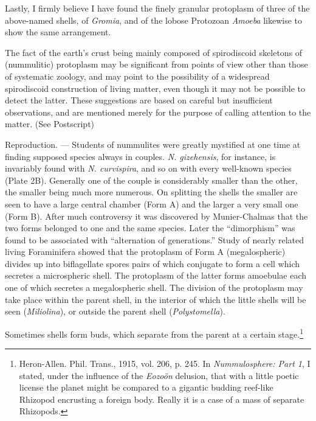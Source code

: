 \documentclass[a4paper, 12pt, oneside]{article}
\begin{document}
Lastly, I firmly believe I have found the finely granular protoplasm of three of the above-named shells, of \emph{Gromia}, and of the lobose Protozoan \emph{Amoeba} likewise to show the same arrangement.

The fact of the earth's crust being mainly composed of spirodiscoid skeletons of (nummulitic) protoplasm may be significant from points of view other than those of systematic zoology, and may point to the possibility of a widespread spirodiscoid construction of living matter, even though it may not be possible to detect the latter. These suggestions are based on careful but insufficient observations, and are mentioned merely for the purpose of calling attention to the matter. (See Postscript)

Reproduction. --- Students of nummulites were greatly mystified at one time at finding supposed species always in couples. \emph{N. gizehensis}, for instance, is invariably found with \emph{N. curvispira}, and so on with every well-known species (Plate 2B). Generally one of the couple is considerably smaller than the other, the smaller being much more numerous. On splitting the shells the smaller are seen to have a large central chamber (Form A) and the larger a very small one (Form B). After much controversy it was discovered by Munier-Chalmas that the two forms belonged to one and the same species. Later the ``dimorphism'' was found to be associated with ``alternation of generations.'' Study of nearly related living Foraminifera showed that the protoplasm of Form A (megalospheric) divides up into biflagellate spores pairs of which conjugate to form a cell which secretes a microspheric shell. The protoplasm of the latter forms amoebulae each one of which secretes a megalospheric shell. The division of the protoplasm may take place within the parent shell, in the interior of which the little shells will be seen (\emph{Miliolina}), or outside the parent shell (\emph{Polystomella}).

Sometimes shells form buds, which separate from the parent at a certain stage.\footnote{Heron-Allen. Phil. Trans., 1915, vol. 206, p. 245. In \emph{Nummulosphere: Part 1}, I stated, under the influence of the \emph{Eozoön} delusion, that with a little poetic license the planet might be compared to a gigantic budding reef-like Rhizopod encrusting a foreign body. Really it is a case of a mass of separate Rhizopods.}
\end{document}

